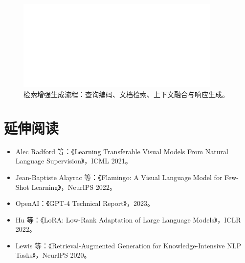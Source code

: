 \documentclass[UTF8,zihao=-4]{ctexart}
\begin{document}
\begin{figure}[H]
  \centering
  \includegraphics[width=0.9\textwidth]{rag_pipeline.png}
  \caption{检索增强生成流程：查询编码、文档检索、上下文融合与响应生成。}
  \label{fig:rag_pipeline_cn}
\end{figure}
\FloatBarrier

\section*{延伸阅读}
\begin{itemize}
  \item Alec Radford 等：《Learning Transferable Visual Models From Natural Language Supervision》，ICML 2021。
  \item Jean-Baptiste Alayrac 等：《Flamingo: A Visual Language Model for Few-Shot Learning》，NeurIPS 2022。
  \item OpenAI：《GPT-4 Technical Report》，2023。
  \item Hu 等：《LoRA: Low-Rank Adaptation of Large Language Models》，ICLR 2022。
  \item Lewis 等：《Retrieval-Augmented Generation for Knowledge-Intensive NLP Tasks》，NeurIPS 2020。
\end{itemize}
\end{document}
